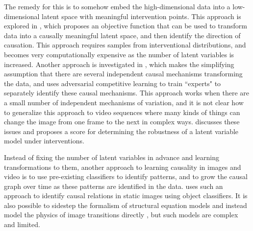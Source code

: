 \documentclass[letterpaper]{article} %
\begin{document}
The remedy for this is to somehow embed the high-dimensional data into a low-dimensional latent space with meaningful intervention points. This approach is explored in \cite{bengio2019meta}, which proposes an objective function that can be used to transform data into a causally meaningful latent space, and then identify the direction of causation. This approach requires samples from interventional distributions, and becomes very computationally expensive as the number of latent variables is increased. Another approach is investigated in \cite{parascandolo2017learning}, which makes the simplifying assumption that there are several independent causal mechanisms transforming the data, and uses adversarial competitive learning to train ``experts" to separately identify these causal mechanisms. This approach works when there are a small number of independent mechanisms of variation, and it is not clear how to generalize this approach to video sequences where many kinds of things can change the image from one frame to the next in complex ways. \cite{suter2018interventional} discusses these issues and proposes a score for determining the robustness of a latent variable model under interventions.

Instead of fixing the number of latent variables in advance and learning transformations to them, another approach to learning causality in images and video is to use pre-existing classifiers to identify patterns, and to grow the causal graph over time as these patterns are identified in the data. \cite{lopez2017discovering} uses such an approach to identify causal relations in static images using object classifiers. It is also possible to sidestep the formalism of structural equation models and instead model the physics of image transitions directly \cite{brubaker2009estimating} \cite{watter2015embed}, but such models are complex and limited.
\end{document}
